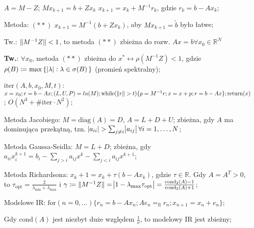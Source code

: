 
\entry
$A=M-Z$;
\entry
$Mx_{k+1}=b+Zx_{k}$
\entry
$x_{k+1}=x_k+M^{-1}r_k$, gdzie $r_k=b-Ax_k$;

\entry
Metoda: $\mathrm{(**)}$ $x_{k+1}=M^{-1}(b+Zx_k)$,
aby $Mx_{k+1}=\tilde{b}$ było łatwe;

\entry
Tw.: $\|M^{-1}Z\| < 1$,
to metoda $\mathrm{(**)}$ zbieżna do rozw. $Ax=b \forall x_0 \in \mathbb{R}^N$

\entry
\textbf{Tw.}:
$\forall x_0$,
metoda $\mathrm{(**)}$
zbieżna do $x^* \leftrightarrow \rho(M^{-1}Z) < 1$,
gdzie $\rho(B) \coloneqq \max\set{\abs{\lambda} : \lambda \in \sigma(B)}$
(promień spektralny);

\entry
$\mathrm{iter}(A,b,x_0,M,t)$:
$x=x_0;
r=b - Ax;
(L,U,P) = lu(M);
\mathrm{while}(\|r\| > t) \{
    p = M^{-1}r;
    x=x+p;
    r=b-Ax
\};
\mathrm{return}(x)
$;
$O(N^3 + \mathrm{\#iter} \cdot N^2)$;

\entry
Metoda Jacobiego:
$M=\mathrm{diag}(A) = D$, $A=L+D+U$;
zbieżna, gdy $A$ ma dominująca przekątną,
tzn. $\abs{a_{ii}} > \sum_{j\neq i}\abs{a_{ij}} \forall i=1, \ldots, N$;

\entry
Metoda Gaussa-Seidla:
$M = L + D$;
zbieżna, gdy $a_{ii}x_i^{k+1}=b_i-\sum_{j>i}a_{ij}x^k-\sum_{j<i}a_{ij}x^{k+1}$;

\entry
Metoda Richardsona:
$x_k+1 = x_k + \tau(b-Ax_k)$, gdzie $\tau\in\mathbb{R}$.
Gdy $A=A^T>0$,
to $\tau_{\mathrm{opt}}=\frac{2}{\lambda_{\mathrm{min}} + \lambda_{\mathrm{max}} }$
i $\gamma \coloneqq \|M^{-1}Z\|=\abs{1-\lambda_{\mathrm{max}}\tau_{\mathrm{opt}}}=\frac{\mathrm{cond}_2(A)-1}{\mathrm{cond}_2(A) + 1}$;

\entry
Modelowe IR:
$\mathrm{for}(n=0,\ldots)\{ r_n=b-Ax_n; Ae_n=_{\mathrm{fl}}r_n; x_{n+1} = x_n + e_n \}$;


\entry
Gdy $\mathrm{cond}(A)$ jest niezbyt duże względem $\frac{1}{\nu}$, to modelowy IR jest zbieżny;

